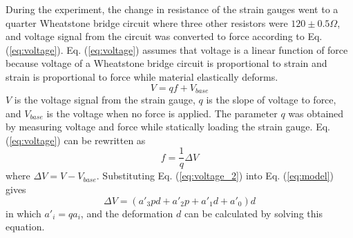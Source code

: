 During the experiment, the change in resistance of the strain gauges went to a quarter Wheatstone bridge circuit where three other resistors were $120 \pm 0.5 \Omega$, and voltage signal from the circuit was converted to force according to Eq. (\ref{eq:voltage}). Eq. (\ref{eq:voltage}) assumes that voltage is a linear function of force because voltage of a Wheatstone bridge circuit is proportional to strain\cite{wheatstone} and strain is proportional to force while material elastically deforms.
\begin{equation}
    \label{eq:voltage}
    V=qf+V_{base}
\end{equation}
$V$ is the voltage signal from the strain gauge, $q$ is the slope of voltage to force, and $V_{base}$ is the voltage when no force is applied.
The parameter $q$ was obtained by measuring voltage and force while statically loading the strain gauge.
Eq.(\ref{eq:voltage}) can be rewritten as
\begin{equation}
    \label{eq:voltage_2}
    f = \frac{1}{q}\Delta V
\end{equation}
where $\Delta V = V - V_{base}$. Substituting Eq. (\ref{eq:voltage_2}) into Eq. (\ref{eq:model}) gives
\begin{equation}
    \label{eq:model_voltage}
    \Delta V = (a'_3pd + a'_2p + a'_1d + a'_0)d
\end{equation}
in which $a'_i=qa_i$, and the deformation $d$ can be calculated by solving this equation.

